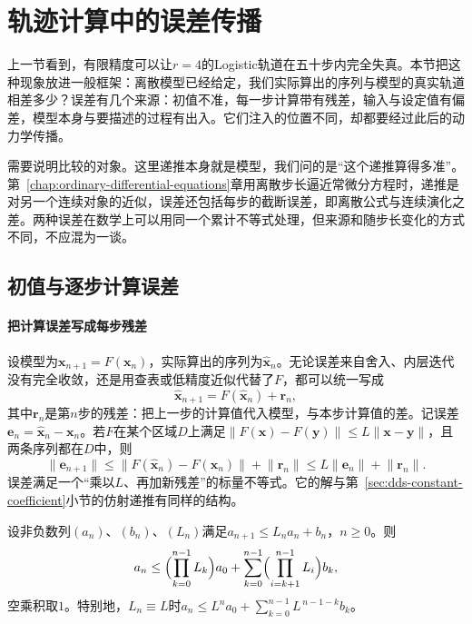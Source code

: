 
\section{轨迹计算中的误差传播}
\label{sec:dds-error-propagation}

上一节看到，有限精度可以让$r=4$的Logistic轨道在五十步内完全失真。本节把这种现象放进一般框架：离散模型已经给定，我们实际算出的序列与模型的真实轨道相差多少？误差有几个来源：初值不准，每一步计算带有残差，输入与设定值有偏差，模型本身与要描述的过程有出入。它们注入的位置不同，却都要经过此后的动力学传播。

需要说明比较的对象。这里递推本身就是模型，我们问的是“这个递推算得多准”。第~\ref{chap:ordinary-differential-equations}章用离散步长逼近常微分方程时，递推是对另一个连续对象的近似，误差还包括每步的截断误差，即离散公式与连续演化之差。两种误差在数学上可以用同一个累计不等式处理，但来源和随步长变化的方式不同，不应混为一谈。

\subsection{初值与逐步计算误差}
\label{sec:dds-computation-error}

\paragraph{把计算误差写成每步残差}
设模型为$\bm x_{n+1}=F(\bm x_n)$，实际算出的序列为$\hat{\bm x}_n$。无论误差来自舍入、内层迭代没有完全收敛，还是用查表或低精度近似代替了$F$，都可以统一写成
\[
  \hat{\bm x}_{n+1}=F(\hat{\bm x}_n)+\bm r_n ,
\]
其中$\bm r_n$是第$n$步的残差：把上一步的计算值代入模型，与本步计算值的差。记误差$\bm e_n=\hat{\bm x}_n-\bm x_n$。若$F$在某个区域$D$上满足$\lVert F(\bm x)-F(\bm y)\rVert\leq L\lVert\bm x-\bm y\rVert$，且两条序列都在$D$中，则
\[
  \lVert\bm e_{n+1}\rVert\leq\lVert F(\hat{\bm x}_n)-F(\bm x_n)\rVert+\lVert\bm r_n\rVert\leq L\lVert\bm e_n\rVert+\lVert\bm r_n\rVert .
\]
误差满足一个“乘以$L$、再加新残差”的标量不等式。它的解与第~\ref{sec:dds-constant-coefficient}小节的仿射递推有同样的结构。

\begin{lemma}[离散Grönwall不等式]
\label{lem:dds-discrete-gronwall}
设非负数列$(a_n)$、$(b_n)$、$(L_n)$满足$a_{n+1}\leq L_na_n+b_n$，$n\geq0$。则
\[
  a_n\leq\Bigl(\prod_{k=0}^{n-1}L_k\Bigr)a_0+\sum_{k=0}^{n-1}\Bigl(\prod_{i=k+1}^{n-1}L_i\Bigr)b_k ,
\]
空乘积取$1$。特别地，$L_n\equiv L$时$a_n\leq L^na_0+\sum_{k=0}^{n-1}L^{\,n-1-k}b_k$。
\end{lemma}

